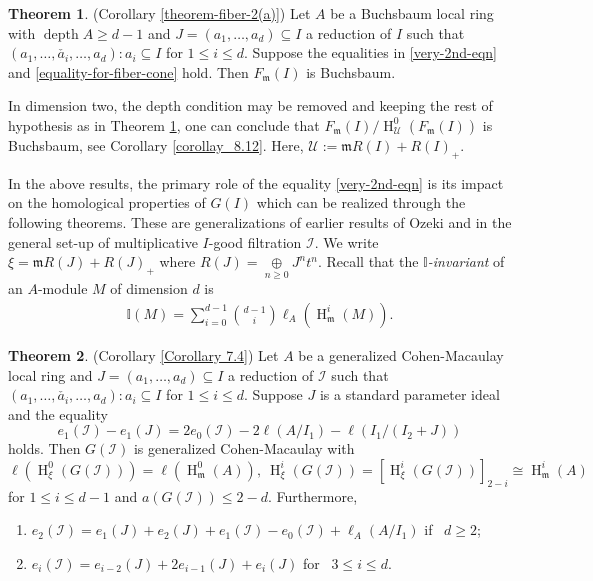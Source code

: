 \documentclass[11pt,reqno]{amsart}
\theoremstyle{definition}
\newcommand{\m}{\mathfrak m}
\def\U{{\mathcal U}}
\def\I{{\mathcal I}}
\newtheorem{mainthm}{Theorem}
\DeclareMathOperator{\h}{H}
\DeclareMathOperator{\depth}{depth}
\numberwithin{equation}{section}
\begin{document}
	\begin{mainthm}\label{theorem-fiber-m2} (Corollary \ref{theorem-fiber-2(a)})
			Let $A$ be a Buchsbaum local ring with $\depth A\geq d-1$ and   $J=(a_1,\ldots,a_d)\subseteq I$ a reduction of $I$  such that $(a_1,\ldots, \check{a_i},\ldots,a_d):a_i\subseteq I$ for $1\leq i\leq d$. Suppose the equalities in \eqref{very-2nd-eqn} and \eqref{equality-for-fiber-cone} hold. Then 
		$F_\m(I)$ is Buchsbaum. 
		\end{mainthm}
In dimension two, the depth condition may be removed and keeping the rest of hypothesis as in Theorem \ref{theorem-fiber-m2}, one can conclude that $F_{\m}(I)/ \h^0_\U(F_\m (I))$ is Buchsbaum, see Corollary \ref{corollay_8.12}.  Here, $\mathcal{U}:=\m R(I)+R(I)_+$. 

In the above results, the primary role of the equality \eqref{very-2nd-eqn} is its impact on the homological properties of $G(I)$ which can be realized through the following theorems. These are generalizations of earlier results of Ozeki \cite{ozeki12} and \cite{ozeki13} in the general set-up of multiplicative  $I$-good filtration $\mathcal{I}.$  We write $\xi=\m R(J)+R(J)_+$ where $R(J)=\mathop\oplus\limits_{n\geq 0}J^nt^n$. Recall that the {\textit{$\mathds{I}$-invariant}} of an $A$-module $M$ of dimension $d$ is 
	\begin{align*}
		\mathbb{I}(M)= \mathop\sum_{i=0}^{d-1}\binom{d-1}{i}\ell_A(\h_{\m}^i(M)).
	\end{align*}		 
		 \begin{mainthm}\label{t1}(Corollary \ref{Corollary 7.4})
		 	Let $A$ be a generalized Cohen-Macaulay local ring and $J=(a_1,\ldots,a_d)\subseteq I$  a reduction of $\I$  such that $(a_1,\ldots, \check{a_i},\ldots,a_d):a_i\subseteq I$ for $1\leq i\leq d$. Suppose $J$ is a standard parameter ideal  and the equality \begin{equation*}e_1(\I)-e_1(J)=2e_0(\I)-2\ell(A/I_1)-\ell(I_1/(I_2+J))
		 	\end{equation*}  holds. Then $G(\I)$ is generalized Cohen-Macaulay with $$\ell(\h^0_{\xi}(G(\I)))=\ell(\h^0_{\m}(A)),~ \h^i_{\xi}(G(\I))=[\h^i_{\xi}(G(\I))]_{2-i}\cong \h^i_{\m}(A)$$ for $1\leq i\leq d-1$ and $a(G(\I))\leq 2-d.$  Furthermore,
	\begin{enumerate}
\item%
 $e_2(\I)=e_1(J)+e_2(J)+e_1(\I)-e_0(\I)+\ell_A(A/I_1)$ \mbox{if } $d\geq 2$;
 \item%
 $e_i(\I)=e_{i-2}(J)+2e_{i-1}(J)+e_i(J)$ \mbox{for } $3\leq i\leq d$.
	 \end{enumerate}
		 \end{mainthm}
\end{document}
